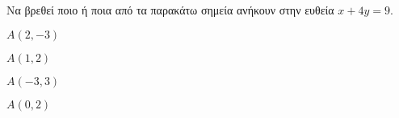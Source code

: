 Να βρεθεί ποιο ή ποια από τα παρακάτω σημεία ανήκουν στην ευθεία $ x+4y=9 $.
\begin{multicols}{2}
\begin{rlist}[leftmargin=5mm]
\item $ A(2,-3) $
\item $ A(1,2) $
\item $ A(-3,3) $
\item $ A(0,2) $
\end{rlist}
\end{multicols}
